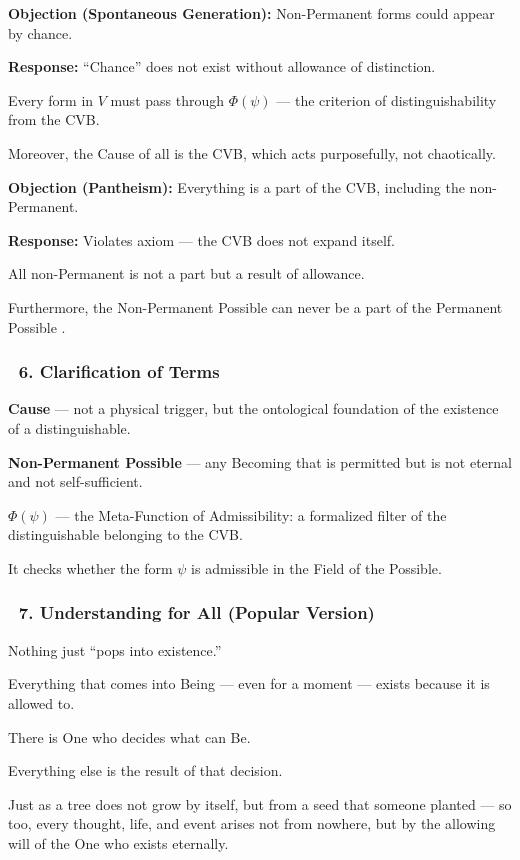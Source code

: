 \documentclass[12pt]{article}
\begin{document}
\textbf{Objection (Spontaneous Generation):} Non-Permanent forms could appear by chance.

\textbf{Response:} ``Chance'' does not exist without allowance of distinction.

Every form in $V$ must pass through $\Phi(\psi)$ — the criterion of distinguishability from the CVB.

Moreover, the Cause of all is the CVB, which acts purposefully, not chaotically.

\textbf{Objection (Pantheism):} Everything is a part of the CVB, including the non-Permanent.

\textbf{Response:} Violates axiom \text{[13]} — the CVB does not expand itself.

All non-Permanent is not a part but a result of allowance.

Furthermore, the Non-Permanent Possible \text{[4.3]} can never be a part of the Permanent Possible \text{[4.4]}.

\subsubsection*{🔹 6. Clarification of Terms}

\textbf{Cause} — not a physical trigger, but the ontological foundation of the existence of a distinguishable.

\textbf{Non-Permanent Possible} — any Becoming that is permitted but is not eternal and not self-sufficient.

\textbf{$\Phi(\psi)$} — the Meta-Function of Admissibility: a formalized filter of the distinguishable belonging to the CVB.

It checks whether the form $\psi$ is admissible in the Field of the Possible.

\subsubsection*{🔹 7. Understanding for All (Popular Version)}

Nothing just ``pops into existence.''

Everything that comes into Being — even for a moment — exists because it is allowed to.

There is One who decides what can Be.

Everything else is the result of that decision.

Just as a tree does not grow by itself, but from a seed that someone planted — so too, every thought, life, and event arises not from nowhere, but by the allowing will of the One who exists eternally.
\end{document}
